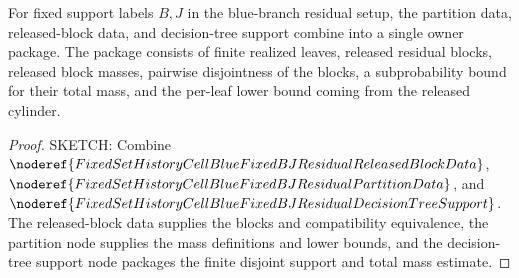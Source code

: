 \begin{helper}
For fixed support labels \(B,J\) in the blue-branch residual setup, the
partition data, released-block data, and decision-tree support combine into a
single owner package.  The package consists of finite realized leaves,
released residual blocks, released block masses, pairwise disjointness of the
blocks, a subprobability bound for their total mass, and the per-leaf lower
bound coming from the released cylinder.
\end{helper}
\begin{proof}
SKETCH:
Combine
\(\noderef{FixedSetHistoryCellBlueFixedBJResidualReleasedBlockData}\),
\(\noderef{FixedSetHistoryCellBlueFixedBJResidualPartitionData}\), and
\(\noderef{FixedSetHistoryCellBlueFixedBJResidualDecisionTreeSupport}\).
The released-block data supplies the blocks and compatibility equivalence,
the partition node supplies the mass definitions and lower bounds, and the
decision-tree support node packages the finite disjoint support and total
mass estimate.
\end{proof}
